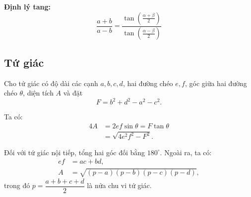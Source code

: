 \textbf{Định lý tang:}
\[
    \frac{a+b}{a-b}
    =
    \frac{\tan\left(\frac{\alpha+\beta}{2}\right)}
         {\tan\left(\frac{\alpha-\beta}{2}\right)}
\]

\subsection{Tứ giác}

Cho tứ giác có độ dài các cạnh $a,b,c,d$, hai đường chéo $e,f$,
góc giữa hai đường chéo $\theta$, diện tích $A$ và đặt
\[
F = b^2+d^2-a^2-c^2.
\]

Ta có:
\begin{align*}
    4A &= 2ef\sin\theta = F\tan\theta \\
       &= \sqrt{4e^2f^2-F^2}.
\end{align*}

Đối với tứ giác nội tiếp, tổng hai góc đối bằng $180^\circ$.
Ngoài ra, ta có:
\begin{align*}
    ef &= ac+bd, \\
    A &= \sqrt{(p-a)(p-b)(p-c)(p-d)},
\end{align*}
trong đó $p = \dfrac{a+b+c+d}{2}$ là nửa chu vi tứ giác.

